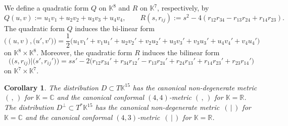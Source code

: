 \documentclass[pdftex]{sigma}
\numberwithin{equation}{section}
\newtheorem{Corollary}[Theorem]{Corollary}
\theoremstyle{definition}
\newcommand{\R}{\mathbb{R}}
\newcommand{\C}{\mathbb{C}}
\newcommand{\KK}{\mathbb{K}}
\newcommand{\0}{\boldsymbol{0}}
\begin{document}
We define a quadratic form $Q$ on $\KK^8$ and $R$ on $\KK^7$, respectively, by
\[
Q(u, v) := u_1v_1 + u_2v_2 + u_3v_3 + u_4v_4, \qquad R(s, r_{ij}) := s^2 - 4(r_{12}r_{34} - r_{13}r_{24} + r_{14}r_{23}).
\]
The quadratic form $Q$ induces the bi-linear form
\[
\bigl((u, v), \bigl(u', v'\bigr)\bigr) =
\frac{1}{2}\bigl( u_1v_1' + v_1u_1' + u_2v_2' + v_2u_2' + u_3v_3' + v_3u_3' + u_4v_4' + v_4u_4'\bigr)
\]
on $\KK^8 \times \KK^8$. Moreover, the quadratic form $R$ induces the bilinear form
\[
\bigl(\bigl(s, r_{ij}\bigr) \vert \bigl(s', r_{ij}'\bigr)\bigr) = ss' - 2\bigl( r_{12}r_{34}' + r_{34}r_{12}' - r_{13}r_{24}' + r_{24}r_{13}' + r_{14}r_{23}' + r_{23}r_{14}'\bigr)
\]
on $\KK^7\times \KK^7$.

\begin{Corollary}
\label{Conformal-metrics}
The distribution $D \subset T\KK^{15}$ has the canonical non-degenerate metric $(\, ,\, )$ for ${\KK = \C}$ and
the canonical conformal $(4, 4)$-metric $(\, ,\, )$ for $\KK = \R$.
The distribution ${D^\perp \subset T^*\KK^{15}}$ has the canonical non-degenerate metric~$(\, \vert \, )$ for $\KK = \C$ and
the canonical conformal $(4, 3)$-metric~$(\, \vert \, )$ for $\KK = \R$.
\end{Corollary}
\end{document}
